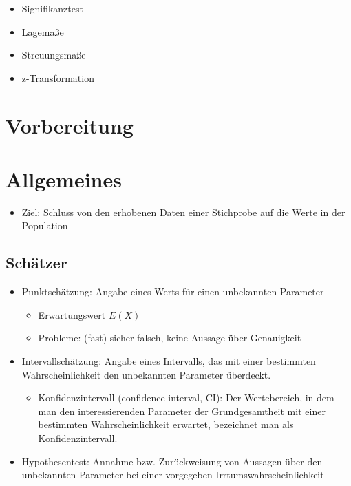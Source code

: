 \documentclass[
]{book}
\providecommand{\tightlist}{%
  \setlength{\itemsep}{0pt}\setlength{\parskip}{0pt}}
\begin{document}
\begin{itemize}
\tightlist
\item
  Signifikanztest
\item
  Lagemaße
\item
  Streuungsmaße
\item
  z-Transformation
\end{itemize}

\hypertarget{vorbereitung-2}{%
\section{Vorbereitung}\label{vorbereitung-2}}

\hypertarget{allgemeines-2}{%
\section{Allgemeines}\label{allgemeines-2}}

\begin{itemize}
\tightlist
\item
  Ziel: Schluss von den erhobenen Daten einer Stichprobe auf die Werte in der Population
\end{itemize}

\hypertarget{schuxe4tzer}{%
\subsection{Schätzer}\label{schuxe4tzer}}

\begin{itemize}
\tightlist
\item
  Punktschätzung: Angabe eines Werts für einen unbekannten Parameter

  \begin{itemize}
  \tightlist
  \item
    Erwartungswert \(E(X)\)
  \item
    Probleme: (fast) sicher falsch, keine Aussage über Genauigkeit
  \end{itemize}
\item
  Intervallschätzung: Angabe eines Intervalls, das mit einer bestimmten Wahrscheinlichkeit den unbekannten Parameter überdeckt.

  \begin{itemize}
  \tightlist
  \item
    Konfidenzintervall (confidence interval, CI): Der Wertebereich, in dem man den interessierenden Parameter
    der Grundgesamtheit mit einer bestimmten Wahrscheinlichkeit erwartet,
    bezeichnet man als Konfidenzintervall.
  \end{itemize}
\item
  Hypothesentest: Annahme bzw. Zurückweisung von Aussagen über den unbekannten Parameter bei einer vorgegeben Irrtumswahrscheinlichkeit
\end{itemize}
\end{document}
